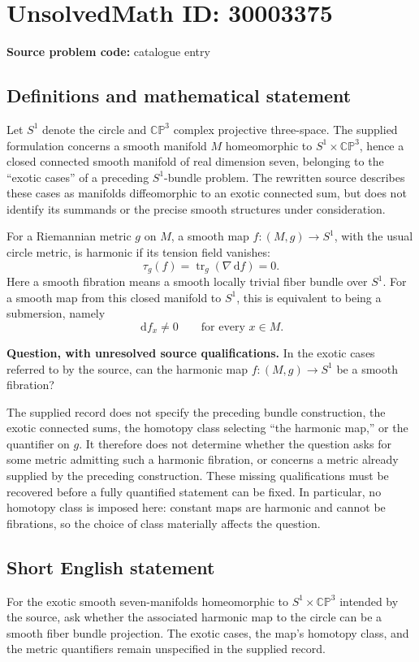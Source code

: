 \documentclass[11pt]{article}
\newcommand{\dd}{\,\mathrm{d}}
\begin{document}
\section*{UnsolvedMath ID: 30003375}
\textbf{Source problem code:} catalogue entry
\subsection{Definitions and mathematical statement}
Let \(S^1\) denote the circle and \(\mathbb{CP}^3\) complex projective three-space. The supplied formulation concerns a smooth manifold \(M\) homeomorphic to \(S^1\times\mathbb{CP}^3\), hence a closed connected smooth manifold of real dimension seven, belonging to the ``exotic cases'' of a preceding \(S^1\)-bundle problem. The rewritten source describes these cases as manifolds diffeomorphic to an exotic connected sum, but does not identify its summands or the precise smooth structures under consideration.

For a Riemannian metric \(g\) on \(M\), a smooth map \(f:(M,g)\to S^1\), with the usual circle metric, is harmonic if its tension field vanishes:
\[
\tau_g(f)=\operatorname{tr}_g(\nabla \dd f)=0.
\]
Here a smooth fibration means a smooth locally trivial fiber bundle over \(S^1\). For a smooth map from this closed manifold to \(S^1\), this is equivalent to being a submersion, namely
\[
\dd f_x\ne 0\qquad\text{for every }x\in M.
\]

\textbf{Question, with unresolved source qualifications.} In the exotic cases referred to by the source, can the harmonic map \(f:(M,g)\to S^1\) be a smooth fibration?

The supplied record does not specify the preceding bundle construction, the exotic connected sums, the homotopy class selecting ``the harmonic map,'' or the quantifier on \(g\). It therefore does not determine whether the question asks for some metric admitting such a harmonic fibration, or concerns a metric already supplied by the preceding construction. These missing qualifications must be recovered before a fully quantified statement can be fixed. In particular, no homotopy class is imposed here: constant maps are harmonic and cannot be fibrations, so the choice of class materially affects the question.
\subsection{Short English statement}
For the exotic smooth seven-manifolds homeomorphic to \(S^1\times\mathbb{CP}^3\) intended by the source, ask whether the associated harmonic map to the circle can be a smooth fiber bundle projection. The exotic cases, the map's homotopy class, and the metric quantifiers remain unspecified in the supplied record.
\end{document}
